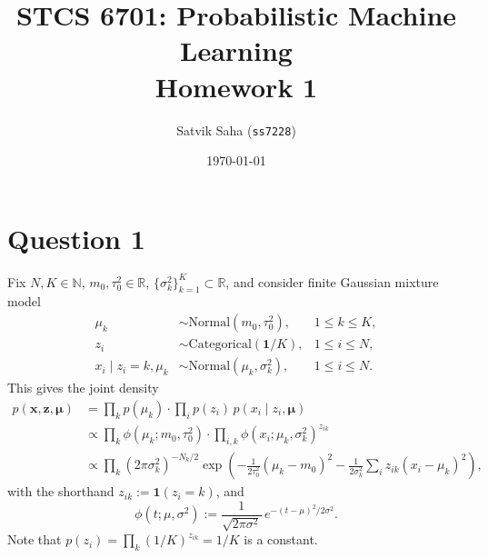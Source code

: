 \documentclass[12pt]{article}
\title{
    STCS 6701: Probabilistic Machine Learning \\
    Homework 1%
}
\author{
    Satvik Saha ({\tt ss7228})%
}
\date{
    \vspace{-1.2em}
    \today%
}
\newcommand{\N}{\mathbb{N}}
\newcommand{\R}{\mathbb{R}}
\begin{document}
\maketitle



\section*{Question 1}

Fix $N, K \in \N$, $m_0, \tau_0^2 \in \R$, $\{\sigma_k^2\}_{k = 1}^K \subset
\R$, and consider finite Gaussian mixture model
\begin{align*}
    \mu_k &\sim \text{Normal}(m_0, \tau_0^2), & 1 \leq k \leq K, \\
    z_i &\sim \text{Categorical}(\bm{1}/K), & 1 \leq i \leq N, \\
    x_i \mid z_i = k, \mu_k &\sim \text{Normal}(\mu_k, \sigma_k^2), & 1 \leq i \leq N.
\end{align*}
This gives the joint density \begin{align*}
    p(\bm{x}, \bm{z}, \bm{\mu})
        &= \prod_k p(\mu_k) \cdot \prod_i p(z_i)\, p(x_i \mid z_i, \bm{\mu}) \\
        &\propto \prod_k \phi(\mu_k; m_0, \tau_0^2) \cdot \prod_{i, k} \phi(x_i; \mu_k, \sigma_k^2)^{z_{ik}} \\
        &\propto \prod_k (2\pi\sigma_k^2)^{-N_k /2} \exp\left(-\frac{1}{2\tau_0^2}(\mu_k - m_0)^2 - \frac{1}{2\sigma_k^2} \sum_{i} z_{ik}(x_i - \mu_k)^2\right), \tag{$\star$} \label{Q1_joint}
\end{align*}
with the shorthand $z_{ik} := \bm{1}(z_i = k)$, and \[
    \phi(t; \mu, \sigma^2) := \frac{1}{\sqrt{2\pi\sigma^2}}\, e^{-(t - \mu)^2 / 2\sigma^2}.
\] Note that $p(z_i) = \prod_k (1 /K)^{z_{ik}} = 1 /K$ is a constant.

\end{document}
